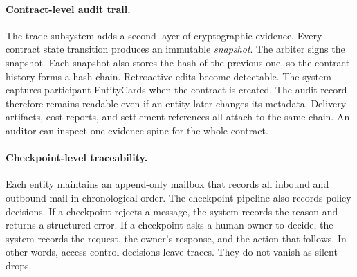 \paragraph{Contract-level audit trail.}
The trade subsystem adds a second layer of cryptographic evidence.
Every contract state transition produces an immutable \emph{snapshot}. The arbiter signs the snapshot. Each snapshot also stores the hash of the previous one, so the contract history forms a hash chain. Retroactive edits become detectable.
The system captures participant EntityCards when the contract is created. The audit record therefore remains readable even if an entity later changes its metadata. Delivery artifacts, cost reports, and settlement references all attach to the same chain. An auditor can inspect one evidence spine for the whole contract.

\paragraph{Checkpoint-level traceability.}
Each entity maintains an append-only mailbox that records all inbound and outbound mail in chronological order. 
The checkpoint pipeline also records policy decisions. If a checkpoint rejects a message, the system records the reason and returns a structured error. If a checkpoint asks a human owner to decide, the system records the request, the owner's response, and the action that follows. In other words, access-control decisions leave traces. They do not vanish as silent drops.
